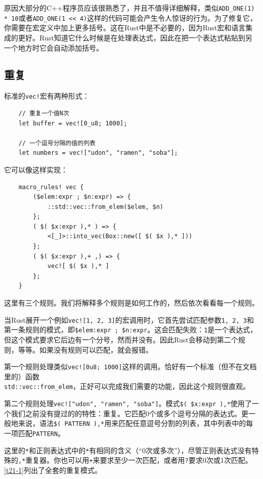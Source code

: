 原因大部分的C++程序员应该很熟悉了，并且不值得详细解释，类似\texttt{ADD\_ONE(1) * 10}或者\texttt{ADD\_ONE(1 << 4)}这样的代码可能会产生令人惊讶的行为。为了修复它，你需要在宏定义中加上更多括号。这在Rust中是不必要的，因为Rust宏和语言集成的更好。Rust知道它什么时候是在处理表达式，因此在把一个表达式粘贴到另一个地方时它会自动添加括号。

\subsection{重复}
标准的\texttt{vec!}宏有两种形式：
\begin{verbatim}
    // 重复一个值N次
    let buffer = vec![0_u8; 1000];

    // 一个逗号分隔的值的列表
    let numbers = vec!["udon", "ramen", "soba"];
\end{verbatim}

它可以像这样实现：
\begin{verbatim}
    macro_rules! vec {
        ($elem:expr ; $n:expr) => {
            ::std::vec::from_elem($elem, $n)
        };
        ( $( $x:expr ),* ) => {
            <[_]>::into_vec(Box::new([ $( $x ),* ]))
        };
        ( $( $x:expr ),+ ,) => {
            vec![ $( $x ),* ]
        };
    }
\end{verbatim}

这里有三个规则。我们将解释多个规则是如何工作的，然后依次看看每一个规则。

当Rust展开一个例如\texttt{vec![1, 2, 3]}的宏调用时，它首先尝试匹配参数\texttt{1, 2, 3}和第一条规则的模式，即\texttt{\$elem:expr ; \$n:expr}。这会匹配失败：\texttt{1}是一个表达式，但这个模式要求它后边有一个分号，然而并没有。因此Rust会移动到第二个规则，等等。如果没有规则可以匹配，就会报错。

第一个规则处理类似\texttt{vec![0u8; 1000]}这样的调用。恰好有一个标准（但不在文档里的）函数\\
\texttt{std::vec::from\_elem}，正好可以完成我们需要的功能，因此这个规则很直观。

第二个规则处理\texttt{vec!["udon", "ramen", "soba"]}。模式\texttt{\$( \$x:expr ),*}使用了一个我们之前没有提过的的特性：重复。它匹配0个或多个逗号分隔的表达式。更一般地来说，语法\texttt{\$( PATTERN ),*}用来匹配任意逗号分割的列表，其中列表中的每一项匹配\texttt{PATTERN}。

这里的\texttt{*}和正则表达式中的\texttt{*}有相同的含义（“0次或多次”），尽管正则表达式没有特殊的\texttt{,*}重复器。你也可以用\texttt{+}来要求至少一次匹配，或者用\texttt{?}要求0次或1次匹配。\autoref{t21-1}列出了全套的重复模式。

